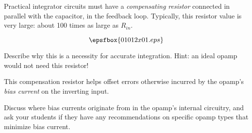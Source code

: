 

Practical integrator circuits must have a {\it compensating resistor} connected in parallel with the capacitor, in the feedback loop.  Typically, this resistor value is very large: about 100 times as large as $R_{in}$.  

$$\epsfbox{01012x01.eps}$$

Describe why this is a necessity for accurate integration.  Hint: an ideal opamp would not need this resistor!







This compensation resistor helps offset errors otherwise incurred by the opamp's {\it bias current} on the inverting input.







Discuss where bias currents originate from in the opamp's internal circuitry, and ask your students if they have any recommendations on specific opamp types that minimize bias current.





